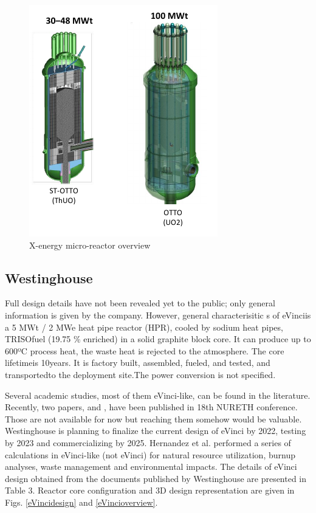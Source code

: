 \begin{figure}[hbtp]
\centering
\includegraphics[scale=0.97]{Figs/xoverview.jpeg}
\caption{X-energy micro-reactor overview}
\label{xo}
\end{figure} 

\subsection{Westinghouse}
Full design details have not been revealed yet to the public; only general information is given by the company. However, general characterisitic s of eVinciis a 5 MWt / 2 MWe heat pipe reactor (HPR), cooled by sodium heat pipes, TRISOfuel (19.75 \% enriched) in  a  solid graphite block  core. It  can  produce  up  to  600ºC  process  heat, the  waste  heat  is  rejected  to  the atmosphere.  The  core lifetimeis 10years.  It  is  factory  built,  assembled,  fueled,  and  tested, and transportedto  the deployment site.The power conversion is not specified.

Several academic studies, most of them eVinci-like, can be found in the literature. Recently, two papers, \cite{hong_thermal_2019} and \cite{wright_phenomena_2019}, have been published in 18th \gls{NURETH} conference. Those are not available for now but reaching them somehow would be valuable. Westinghouse is planning to finalize the current design of eVinci by 2022, testing by 2023 and commercializing by 2025. Hernandez et al. \cite{hernandez_micro_2019} performed a series of calculations in eVinci-like (not eVinci) for natural resource utilization, burnup analyses, waste management and environmental impacts. The details of eVinci design obtained from the documents published by Westinghouse are presented in Table 3. Reactor core configuration and 3D design representation are given in Figs. \ref{eVincidesign} and \ref{eVincioverview}.

